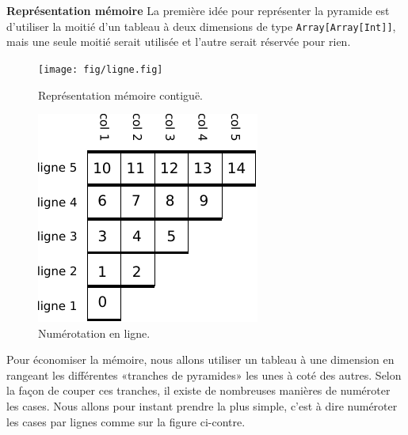 \documentclass[10pt]{article}\usepackage[correction,nu]{esial}
\begin{document}
\begin{Exercice}\textbf{Représentation mémoire}
  \noindent La première idée pour représenter la pyramide est d'utiliser la
  moitié d'un tableau à deux dimensions de type \texttt{Array[Array[Int]]}, mais
  une seule moitié serait utilisée et l'autre serait réservée pour rien.
\end{Exercice}

\begin{figure}[h]
  \centering
  \texttt{[image: fig/ligne.fig]}\vspace{-.5\baselineskip}
  \caption{Représentation mémoire contiguë.}
  \label{fig:mem}%
\end{figure}




\begin{figure}
  \vspace{-1.2\baselineskip}
  \centerline{\includegraphics[scale=.9]{img/numerotation-ligne.pdf}}
  \vspace{-.5\baselineskip}
  \caption{Numérotation en ligne.}
  \label{fig:numligne}
  \vspace{-1.5\baselineskip}
  
\end{figure}

Pour économiser la mémoire, nous allons utiliser un tableau à une dimension en
rangeant les différentes «tranches de pyramides» les unes à coté des
autres. Selon la façon de couper ces tranches, il existe de nombreuses manières
de numéroter les cases. Nous allons pour instant prendre la plus simple, c'est à
dire numéroter les cases par lignes comme sur la figure ci-contre.
\end{document}
